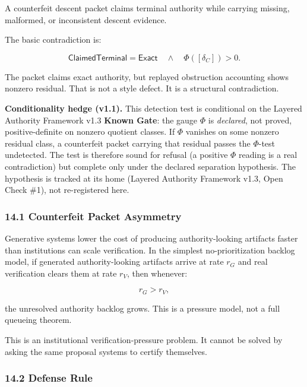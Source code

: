 \documentclass[
  10pt,
]{article}
\begin{document}
A counterfeit descent packet claims terminal authority while carrying missing, malformed, or inconsistent descent evidence.

The basic contradiction is:

\protect\hypertarget{math-E0158-0215}{}{\[
\boxed{
\mathsf{ClaimedTerminal}=\mathsf{Exact}
\quad\wedge\quad
\Phi([\delta_C])>0.
}
\]}

The packet claims exact authority, but replayed obstruction accounting shows nonzero residual. That is not a style defect. It is a structural contradiction.

\textbf{Conditionality hedge (v1.1).} This detection test is conditional on the Layered Authority Framework v1.3 \textbf{Known Gate}: the gauge \protect\hypertarget{math-E0005-0216}{}{\(\Phi\)} is \emph{declared}, not proved, positive-definite on nonzero quotient classes. If \protect\hypertarget{math-E0005-0217}{}{\(\Phi\)} vanishes on some nonzero residual class, a counterfeit packet carrying that residual passes the \protect\hypertarget{math-E0005-0218}{}{\(\Phi\)}-test undetected. The test is therefore sound for refusal (a positive \protect\hypertarget{math-E0005-0219}{}{\(\Phi\)} reading is a real contradiction) but complete only under the declared separation hypothesis. The hypothesis is tracked at its home (Layered Authority Framework v1.3, Open Check \#1), not re-registered here.

\subsubsection{14.1 Counterfeit Packet Asymmetry}\label{counterfeit-packet-asymmetry}

Generative systems lower the cost of producing authority-looking artifacts faster than institutions can scale verification. In the simplest no-prioritization backlog model, if generated authority-looking artifacts arrive at rate \protect\hypertarget{math-E0159-0220}{}{\(r_G\)} and real verification clears them at rate \protect\hypertarget{math-E0160-0221}{}{\(r_V\)}, then whenever:

\protect\hypertarget{math-E0161-0222}{}{\[
r_G>r_V,
\]}

the unresolved authority backlog grows. This is a pressure model, not a full queueing theorem.

This is an institutional verification-pressure problem. It cannot be solved by asking the same proposal systems to certify themselves.

\subsubsection{14.2 Defense Rule}\label{defense-rule}
\end{document}
